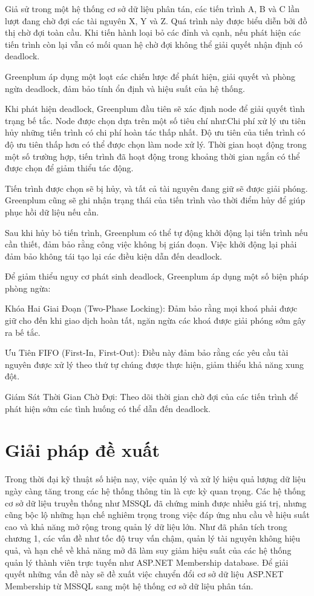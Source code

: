 \documentclass[14pt]{article}
\begin{document}
Giả sử trong một hệ thống cơ sở dữ liệu phân tán, các tiến trình A, B và C lần lượt đang chờ đợi các tài nguyên X, Y và Z. Quá trình này được biểu diễn bởi đồ thị chờ đợi toàn cầu. Khi tiến hành loại bỏ các đỉnh và cạnh, nếu phát hiện các tiến trình còn lại vẫn có mối quan hệ chờ đợi không thể giải quyết nhận định có deadlock.

Greenplum áp dụng một loạt các chiến lược để phát hiện, giải quyết và phòng ngừa deadlock, đảm bảo tính ổn định và hiệu suất của hệ thống.

Khi phát hiện deadlock, Greenplum đầu tiên sẽ xác định node để giải quyết tình trạng bế tắc. Node được chọn dựa trên một số tiêu chí như:Chi phí xử lý ưu tiên hủy những tiến trình có chi phí hoàn tác thấp nhất. Độ ưu tiên của tiến trình có độ ưu tiên thấp hơn có thể được chọn làm node xử lý. Thời gian hoạt động trong một số trường hợp, tiến trình đã hoạt động trong khoảng thời gian ngắn có thể được chọn để giảm thiểu tác động.

Tiến trình được chọn sẽ bị hủy, và tất cả tài nguyên đang giữ sẽ được giải phóng. Greenplum cũng sẽ ghi nhận trạng thái của tiến trình vào thời điểm hủy để giúp phục hồi dữ liệu nếu cần.

Sau khi hủy bỏ tiến trình, Greenplum có thể tự động khởi động lại tiến trình nếu cần thiết, đảm bảo rằng công việc không bị gián đoạn. Việc khởi động lại phải đảm bảo không tái tạo lại các điều kiện dẫn đến deadlock.

Để giảm thiểu nguy cơ phát sinh deadlock, Greenplum áp dụng một số biện pháp phòng ngừa:

Khóa Hai Giai Đoạn (Two-Phase Locking): Đảm bảo rằng mọi khoá phải được giữ cho đến khi giao dịch hoàn tất, ngăn ngừa các khoá được giải phóng sớm gây ra bế tắc.

Ưu Tiên FIFO (First-In, First-Out): Điều này đảm bảo rằng các yêu cầu tài nguyên được xử lý theo thứ tự chúng được thực hiện, giảm thiểu khả năng xung đột.

Giám Sát Thời Gian Chờ Đợi: Theo dõi thời gian chờ đợi của các tiến trình để phát hiện sớm các tình huống có thể dẫn đến deadlock.




\section{Giải pháp đề xuất}

Trong thời đại kỹ thuật số hiện nay, việc quản lý và xử lý hiệu quả lượng dữ liệu ngày càng tăng trong các hệ thống thông tin là cực kỳ quan trọng. Các hệ thống cơ sở dữ liệu truyền thống như MSSQL đã chứng minh được nhiều giá trị, nhưng cũng bộc lộ những hạn chế nghiêm trọng trong việc đáp ứng nhu cầu về hiệu suất cao và khả năng mở rộng trong quản lý dữ liệu lớn. Như đã phân tích trong chương 1, các vấn đề như tốc độ truy vấn chậm, quản lý tài nguyên không hiệu quả, và hạn chế về khả năng mở đã làm suy giảm hiệu suất của các hệ thống quản lý thành viên trực tuyến như ASP.NET Membership database. Để giải quyết những vấn đề này sẽ đề xuất việc chuyển đổi cơ sở dữ liệu ASP.NET Membership từ MSSQL sang một hệ thống cơ sở dữ liệu phân tán.
\end{document}
